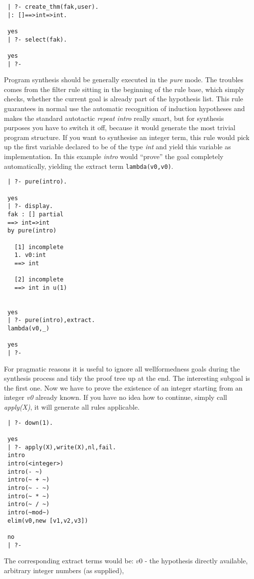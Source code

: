 \documentclass[11pt]{report}
\begin{document}
 \small\begin{verbatim}
 | ?- create_thm(fak,user).
 |: []==>int=>int.
 
 yes
 | ?- select(fak).
 
 yes
 | ?- \end{verbatim}\normalsize
 Program synthesis should be generally executed in the
 \emph{pure} mode. The troubles comes from the filter rule
 sitting in the beginning of the rule base, which simply checks,
 whether the current goal is already part of the hypothesis
 list. This rule guarantees in normal use the automatic recognition
 of induction hypotheses and makes the standard autotactic
 \emph{repeat intro} really smart, but for synthesis purposes
 you have to switch it off, because it would generate the most
 trivial program structure. If you want to synthesise an integer
 term, this rule would pick up the first variable declared to be
 of the type \emph{int} and yield this variable as implementation.
 In this example \emph{intro} would ``prove'' the goal completely 
 automatically, yielding the extract term \verb'lambda(v0,v0)'.
 \small\begin{verbatim}
 | ?- pure(intro).
 
 yes
 | ?- display.
 fak : [] partial 
 ==> int=>int
 by pure(intro)
 
   [1] incomplete
   1. v0:int
   ==> int
 
   [2] incomplete
   ==> int in u(1)
 
 
 yes
 | ?- pure(intro),extract.
 lambda(v0,_)
 
 yes
 | ?- \end{verbatim}\normalsize
 For pragmatic reasons it is useful to ignore all wellformedness
 goals during the synthesis process and tidy the proof tree up
 at the end. The interesting subgoal is the first one. Now we
 have to prove the existence of an integer starting from an
 integer \emph{v0} already known. If you have no idea how to continue,
 simply call \emph{apply(X)}, it will generate all rules applicable.
 \small\begin{verbatim}
 | ?- down(1).
 
 yes
 | ?- apply(X),write(X),nl,fail.
 intro
 intro(<integer>)
 intro(- ~)
 intro(~ + ~)
 intro(~ - ~)
 intro(~ * ~)
 intro(~ / ~)
 intro(~mod~)
 elim(v0,new [v1,v2,v3])
 
 no
 | ?- \end{verbatim}\normalsize
 The corresponding extract terms would be: $v0$ - the hypothesis
 directly available, arbitrary integer numbers (as supplied),
\end{document}
